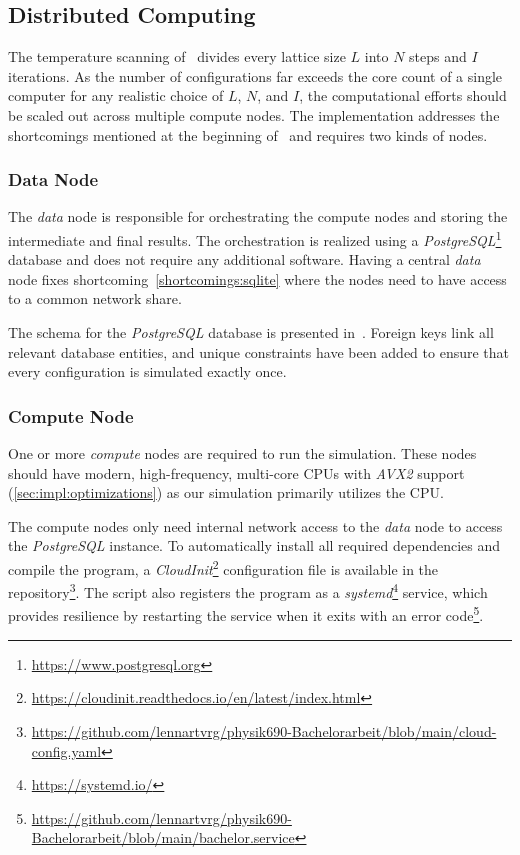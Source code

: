 \subsection{Distributed Computing}\label{sec:impl:computing}
	The temperature scanning of~ divides every lattice size $L$ into $N$ steps and $I$ iterations. As the number of configurations far exceeds the core count of a single computer for any realistic choice of $L$, $N$, and $I$, the computational efforts should be scaled out across multiple compute nodes. The implementation addresses the shortcomings mentioned at the beginning of~ and requires two kinds of nodes.
	
	\subsubsection{Data Node}\label{sec:impl:computing:data}
		The \emph{data} node is responsible for orchestrating the compute nodes and storing the intermediate and final results. The orchestration is realized using a  \emph{PostgreSQL}\footnote{\url{https://www.postgresql.org}} database and does not require any additional software. Having a central \emph{data} node fixes shortcoming~\cref{shortcomings:sqlite} where the nodes need to have access to a common network share.
		
		The schema for the \emph{PostgreSQL} database is presented in~. Foreign keys link all relevant database entities, and unique constraints have been added to ensure that every configuration is simulated exactly once.
	
	\subsubsection{Compute Node}\label{sec:impl:computing:compute}
		One or more \emph{compute} nodes are required to run the simulation. These nodes should have modern, high-frequency, multi-core CPUs with \emph{AVX2} support (\cref{sec:impl:optimizations}) as our simulation primarily utilizes the CPU.
		
		The compute nodes only need internal network access to the \emph{data} node to access the \emph{PostgreSQL} instance. To automatically install all required dependencies and compile the program, a \emph{CloudInit}\footnote{\url{https://cloudinit.readthedocs.io/en/latest/index.html}} configuration file is available in the repository\footnote{\url{https://github.com/lennartvrg/physik690-Bachelorarbeit/blob/main/cloud-config.yaml}}. The script also registers the program as a \emph{systemd}\footnote{\url{https://systemd.io/}} service, which provides resilience by restarting the service when it exits with an error code\footnote{\url{https://github.com/lennartvrg/physik690-Bachelorarbeit/blob/main/bachelor.service}}.
